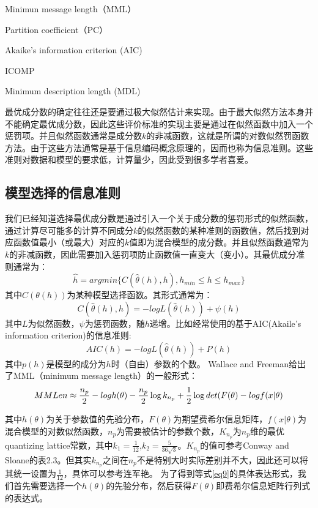 \documentclass[a4paper,12pt,openany,oneside,utf-8]{ctexbook}
\begin{document}
    Minimun message length（MML）\cite{ref29}
    
    Partition coefficient（PC）\cite{ref30}
    
    Akaike's information criterion (AIC)\cite{ref31}
    
    ICOMP\cite{ref32}
    
    Minimum description length (MDL)\cite{ref33}

    最优成分数的确定往往还是要通过极大似然估计来实现。由于最大似然方法本身并不能确定最优成分数，因此这些评价标准的实现主要是通过在似然函数中加入一个惩罚项。并且似然函数通常是成分数$k$的非减函数，这就是所谓的对数似然罚函数方法。由于这些方法通常是基于信息编码概念原理的，因而也称为信息准则。这些准则对数据和模型的要求低，计算量少，因此受到很多学者喜爱。

    \subsection{模型选择的信息准则}
    
	我们已经知道选择最优成分数是通过引入一个关于成分数的惩罚形式的似然函数，通过计算尽可能多的计算不同成分$k$的似然函数的某种准则的函数值，然后找到对应函数值最小（或最大）对应的$k$值即为混合模型的成分数。并且似然函数通常为$k$的非减函数，因此需要加入惩罚项防止函数值一直变大（变小）。其最优成分准则通常为：
	\begin{equation}
	    \hat{h}=arg min\{C(\hat{\theta}(h),h),h_{min}\leq h\leq h_{max}\}
	\end{equation}
    其中$C(\theta(h))$为某种模型选择函数。其形式通常为：
    \begin{equation}
        C(\hat{\theta}(h),h)=-logL(\hat{\theta}(h))+\psi (h)
    \end{equation}
    其中$L$为似然函数，$\psi$为惩罚函数，随$h$递增。比如经常使用的基于AIC(Akaile’s information criterion)的信息准则:
    \begin{equation}
        AIC(h)=-logL(\hat{\theta}(h))+P(h)
    \end{equation}
    其中$p(h)$是模型的成分为$h$时（自由）参数的个数。
    Wallace and Freeman\cite{ref32}给出了MML（minimum message length）的一般形式：
    \begin{equation}\label{eq9}
       MMLen\approx \frac{n_p}{2}-logh(\theta)-\frac{n_p}{2} \log k_{n_p}+\frac{1}{2}\log det(F(\theta)\\-logf(x|\theta)
    \end{equation}

    其中$h(\theta)$为关于参数值的先验分布，$F(\theta)$为期望费希尔信息矩阵，$f(x|\theta)$为混合模型的对数似然函数，$n_p$为需要被估计的参数个数，$K_{n_p}$为$n_p$维的最优quantizing lattice常数，其中$k_1=\frac{1}{12}$,$k_2=\frac{5}{36\sqrt{3}}$。$K_{n_p}$的值可参考Conway and Sloane\cite{ref33}的表2.3。但其实$k_{n_p}$之间在$n_p$不是特别大时实际差别并不大，因此还可以将其统一设置为$\frac{1}{12}$，具体可以参考连军艳\cite{ref34}。
	为了得到等式\ref{eq9}的具体表达形式，我们首先需要选择一个$h(\theta)$的先验分布，然后获得$F(\theta)$即费希尔信息矩阵行列式的表达式。
	
\end{document}
